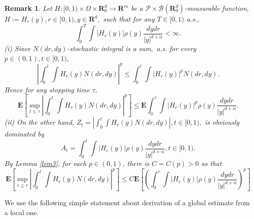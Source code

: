 \documentclass[11pt]{amsart}
\theoremstyle{plain}
\newtheorem{remark}{Remark}
\numberwithin{equation}{section}
\begin{document}
\begin{remark}
\label{re3}Let $H:[0,1)\times \Omega \times \mathbf{R}_{0}^{d}\rightarrow 
\mathbf{R}^{m}$ be a $\mathcal{P\times B}\left( \mathbf{R}_{0}^{d}\right) $-measurable function, $H:=H_{r}\left( y\right) ,r\in \lbrack 0,1),y\in 
\mathbf{R}^{d},$ such that for any $T\in \lbrack 0,1)$ a.s.,\begin{equation*}
\int_{0}^{T}\int \left\vert H_{r}\left( y\right) \right\vert \rho \left(
y\right) \frac{dydr}{\left\vert y\right\vert ^{d+\alpha }}<\infty .
\end{equation*}(i) Since $N\left( dr,dy\right) $-stochastic integral is a sum$,$ a.s. for
every $p\in \left( 0,1\right) ,t\in \lbrack 0,1)$,\begin{equation*}
\left\vert \int_{0}^{t}\int H_{r}\left( y\right) N\left( dr,dy\right)
\right\vert ^{p}\leq \int_{0}^{t}\int \left\vert H_{r}\left( y\right)
\right\vert ^{p}N\left( dr,dy\right) .
\end{equation*}Hence for any stopping time $\tau ,$\begin{equation*}
\mathbf{E}\left[ \sup_{t\leq \tau }\left\vert \int_{0}^{t}\int H_{r}\left(
y\right) N\left( dr,dy\right) \right\vert ^{p}\right] \leq \mathbf{E}\int_{0}^{\tau }\int \left\vert H_{r}\left( y\right) \right\vert ^{p}\rho
\left( y\right) \frac{dydr}{\left\vert y\right\vert ^{d+\alpha }}.
\end{equation*}(ii) On the other hand, $Z_{t}=\left\vert \int_{0}^{t}\int H_{r}\left(
y\right) N\left( dr,dy\right) \right\vert ,t\in \lbrack 0,1),$ is obviously
dominated by 
\begin{equation*}
A_{t}=\int_{0}^{t}\int |H_{r}\left( y\right) |\rho \left( y\right) \frac{dydr}{\left\vert y\right\vert ^{d+\alpha }},t\in \lbrack 0,1).
\end{equation*}By Lemma \ref{lem3}, for each $p\in \left( 0,1\right) $, there is $C=C\left(
p\right) >0$ so that\begin{equation*}
\mathbf{E}\left[ \sup_{t\leq \tau }\left\vert \int_{0}^{t}\int H_{r}\left(
y\right) N\left( dr,dy\right) \right\vert ^{p}\right] \leq C\mathbf{E}\left[
\left( \int_{0}^{\tau }\int \left\vert H_{r}\left( y\right) \right\vert \rho
\left( y\right) \frac{dydr}{\left\vert y\right\vert ^{d+\alpha }}\right) ^{p}\right]
\end{equation*}
\end{remark}

We use the following simple statement about derivation of a global estimate
from a local one.
\end{document}
